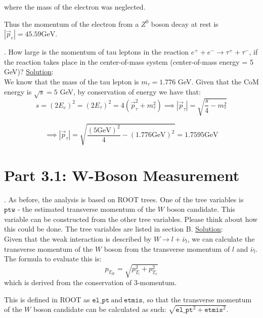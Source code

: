 \documentclass[a4paper]{report}
\numberwithin{equation}{section}
\begin{document}
\noindent where the mass of the electron was neglected. 

\noindent Thus the momentum of the electron from a $Z^0$ boson decay at rest is $|\vec{p}_e| = 45.59 \text{GeV}$. 

\bigbreak

. How large is the momentum of tau leptons in the reaction $e^+ + e^- \rightarrow \tau^+ + \tau^-$, if the reaction takes place in the center-of-mass system (center-of-mass energy = 5 GeV)?
\bigbreak
\noindent \underline{Solution}: \\
\noindent We know that the mass of the tau lepton is $m_\tau = 1.776$ GeV. Given that the CoM energy is $\sqrt{s} = 5$ GeV, by conservation of energy we have that:
$$s = (2 E_e)^2 = (2 E_\tau)^2 = 4 (\vec{p}_\tau^2 + m_\tau^2) \implies |\vec{p}_\tau| = \sqrt{\frac{s}{4} - m_\tau^2}$$

$$
\implies |\vec{p}_\tau| = \sqrt{\frac{(5 \text{GeV})^2}{4} - (1.776 \text{GeV})^2} = 1.7595 \text{GeV}
$$

\section{Part 3.1: W-Boson Measurement}

. As before, the analysis is based on ROOT trees. One of the tree variables is $\texttt{ptw -}$  the estimated transverse momentum of the $W$ boson candidate. This variable can be constructed from the other tree variables. Please think about how this could be done. The tree variables are listed in section B.
\bigbreak
\noindent \underline{Solution}: \\
\noindent Given that the weak interaction is described by $W \rightarrow l + \bar{\nu}_l$, we can calculate the transverse momentum of the $W$ boson from the transverse momentum of $l$ and $\bar{\nu}_l$.  The formula to evaluate this is:
$$p_{T_W} = \sqrt{p_{T_l}^2 + p_{T_\nu}^2}  $$
which is derived from the conservation of 3-momentum.

\noindent This is defined in ROOT as $\texttt{el\_pt} \ \text{and} \ \texttt{etmis}$, so that the transverse momentum of the $W$ boson candidate can be calculated as such: $\sqrt{\texttt{el\_{pt}}^2 + \texttt{etmis}^2}$.

\bigbreak 
\end{document}
